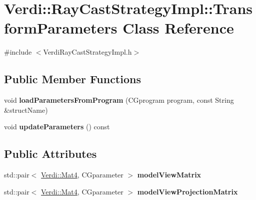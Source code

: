 \hypertarget{class_verdi_1_1_ray_cast_strategy_impl_1_1_transform_parameters}{\section{\-Verdi\-:\-:\-Ray\-Cast\-Strategy\-Impl\-:\-:\-Transform\-Parameters \-Class \-Reference}
\label{class_verdi_1_1_ray_cast_strategy_impl_1_1_transform_parameters}
}


{\ttfamily \#include $<$\-Verdi\-Ray\-Cast\-Strategy\-Impl.\-h$>$}

\subsection*{\-Public \-Member \-Functions}
\begin{DoxyCompactItemize}
\item 
\hypertarget{class_verdi_1_1_ray_cast_strategy_impl_1_1_transform_parameters_a524635e903bd7f727927bf96ffa6199e}{void {\bfseries load\-Parameters\-From\-Program} (\-C\-Gprogram program, const \-String \&struct\-Name)}\label{class_verdi_1_1_ray_cast_strategy_impl_1_1_transform_parameters_a524635e903bd7f727927bf96ffa6199e}

\item 
\hypertarget{class_verdi_1_1_ray_cast_strategy_impl_1_1_transform_parameters_a8240cb0d4a065e6d17df0106a50e6011}{void {\bfseries update\-Parameters} () const }\label{class_verdi_1_1_ray_cast_strategy_impl_1_1_transform_parameters_a8240cb0d4a065e6d17df0106a50e6011}

\end{DoxyCompactItemize}
\subsection*{\-Public \-Attributes}
\begin{DoxyCompactItemize}
\item 
\hypertarget{class_verdi_1_1_ray_cast_strategy_impl_1_1_transform_parameters_ac4ae0e75323f76f53372a49c2828b6bb}{std\-::pair$<$ \hyperlink{class_verdi_1_1_mat4}{\-Verdi\-::\-Mat4}, \*
\-C\-Gparameter $>$ {\bfseries model\-View\-Matrix}}\label{class_verdi_1_1_ray_cast_strategy_impl_1_1_transform_parameters_ac4ae0e75323f76f53372a49c2828b6bb}

\item 
\hypertarget{class_verdi_1_1_ray_cast_strategy_impl_1_1_transform_parameters_a04895606f7f2870cbb2ad1594052b439}{std\-::pair$<$ \hyperlink{class_verdi_1_1_mat4}{\-Verdi\-::\-Mat4}, \*
\-C\-Gparameter $>$ {\bfseries model\-View\-Projection\-Matrix}}\label{class_verdi_1_1_ray_cast_strategy_impl_1_1_transform_parameters_a04895606f7f2870cbb2ad1594052b439}

\end{DoxyCompactItemize}


